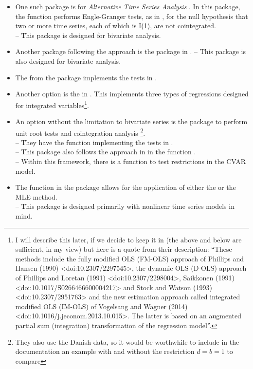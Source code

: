 \documentclass[article]{jss}
\newcommand{\fct}[1]{\code{#1()}}
\begin{document}
\begin{itemize} 

	\item One such package is  for \emph{Alternative Time Series Analysis} \citep{aTSA2015}. 
	In this package, the \fct{coint.test} function performs Engle-Granger tests, as in \citet{EngleGranger1987},  for the null hypothesis that two or more time series, each of which is I(1), are not cointegrated. \\
	-- This package is designed for bivariate analysis.

	\item Another package following the \citet{EngleGranger1987} approach is the  package in \citep{egcm2017}. 
	-- This package is also designed for bivariate analysis.

	\item The \fct{po.test} from the  package \citet{tseries2019} implements the tests in \citet{PhillipsOuliaris1990}. 

	\item Another option is the  in \cite{cointReg2016}. 
This implements three types of regressions designed for integrated variables\footnote{I will describe this later, if we decide to keep it in (the above and below are sufficient, in my view) but here is a quote from their description: ``These methods include the fully modified OLS (FM-OLS) approach of Phillips and Hansen (1990) <doi:10.2307/2297545>, the dynamic OLS (D-OLS) approach of Phillips and Loretan (1991) <doi:10.2307/2298004>, Saikkonen (1991) <doi:10.1017/S0266466600004217> and Stock and Watson (1993) <doi:10.2307/2951763> and the new estimation approach called integrated modified OLS (IM-OLS) of Vogelsang and Wagner (2014) <doi:10.1016/j.jeconom.2013.10.015>. The latter is based on an augmented partial sum (integration) transformation of the regression model''.}.

	\item An option without the limitation to bivariate series is the  package to perform unit root tests and cointegration analysis \citep{urca2016}\footnote{They also use the Danish data, so it would be worthwhile to include in the documentation an example with and without the restriction $d = b = 1$ to compare}. \\
	-- They have the function \fct{ca.po} implementing the tests in \citet{PhillipsOuliaris1990}. \\
	-- This package also follows the approach in \citet{Johansen1995} in the function \fct{ca.jo}. \\
	-- Within this framework, there is a function \fct{cajo.test} to test restrictions in the CVAR model.

	\item The \fct{VECM} function in the  package allows for the application of either the \citet{EngleGranger1987} or the \citet{Johansen1995} MLE method. \\
	-- This package is designed primarily with nonlinear time series models in mind. 

\end{itemize} 
\end{document}
